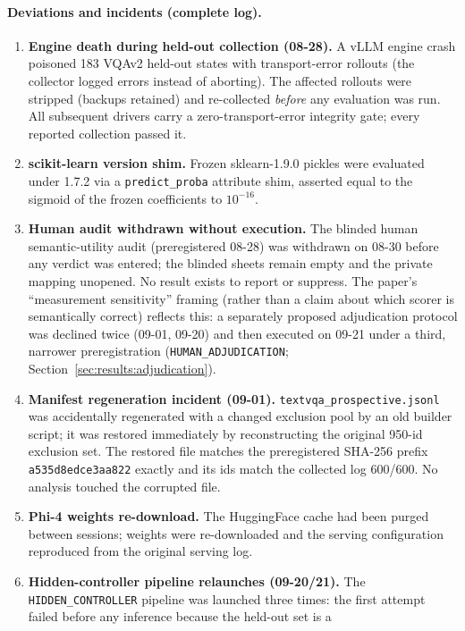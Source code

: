\documentclass[10pt]{article}
\begin{document}
\paragraph{Deviations and incidents (complete log).}
\begin{enumerate}
\item \textbf{Engine death during held-out collection (08-28).} A vLLM
  engine crash poisoned 183 VQAv2 held-out states with transport-error
  rollouts (the collector logged errors instead of aborting). The affected
  rollouts were stripped (backups retained) and re-collected \emph{before}
  any evaluation was run. All subsequent drivers carry a
  zero-transport-error integrity gate; every reported collection passed it.
\item \textbf{scikit-learn version shim.} Frozen sklearn-1.9.0 pickles were
  evaluated under 1.7.2 via a \texttt{predict\_proba} attribute shim,
  asserted equal to the sigmoid of the frozen coefficients to $10^{-16}$.
\item \textbf{Human audit withdrawn without execution.} The blinded human
  semantic-utility audit (preregistered 08-28) was withdrawn on 08-30
  before any verdict was entered; the blinded sheets remain empty and the
  private mapping unopened. No result exists to report or suppress. The
  paper's ``measurement sensitivity'' framing (rather than a claim about
  which scorer is semantically correct) reflects this: a separately
  proposed adjudication protocol was declined twice (09-01, 09-20) and then executed on 09-21 under a third, narrower preregistration (\texttt{HUMAN\_ADJUDICATION}; Section~\ref{sec:results:adjudication}).
\item \textbf{Manifest regeneration incident (09-01).}
  \texttt{textvqa\_prospective.jsonl} was accidentally regenerated with a
  changed exclusion pool by an old builder script; it was restored
  immediately by reconstructing the original 950-id exclusion set. The
  restored file matches the preregistered SHA-256 prefix
  \texttt{a535d8edce3aa822} exactly and its ids match the collected log
  600/600. No analysis touched the corrupted file.
\item \textbf{Phi-4 weights re-download.} The HuggingFace cache had been
  purged between sessions; weights were re-downloaded and the serving
  configuration reproduced from the original serving log.
\item \textbf{Hidden-controller pipeline relaunches (09-20/21).} The
  \texttt{HIDDEN\_CONTROLLER} pipeline was launched three times: the first
  attempt failed before any inference because the held-out set is a

\end{enumerate}
\end{document}
